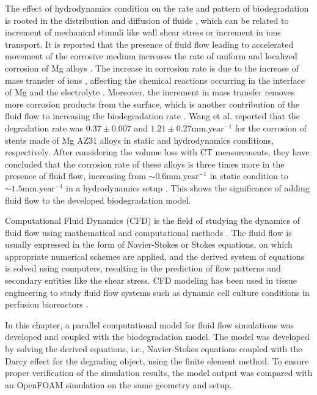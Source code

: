 
The effect of hydrodynamics condition on the rate and pattern of biodegradation is rooted in the distribution and diffusion of fluids \cite{Efird2011}, which can be related to increment of mechanical stimuli like wall shear stress or increment in ions transport. It is reported that the presence of fluid flow leading to accelerated movement of the corrosive medium increases the rate of uniform and localized corrosion of Mg alloys \cite{Wang2014}. The increase in corrosion rate is due to the increase of mass transfer of ions \cite{Efird2011}, affecting the chemical reactions occurring in the interface of Mg and the electrolyte \cite{Hiromoto2008,Xu2009}. Moreover, the increment in mass transfer removes more corrosion products from the surface, which is another contribution of the fluid flow to increasing the biodegradation rate \cite{Efird2011}. Wang et al. \cite{Wang2014} reported that the degradation rate was $0.37\pm0.007$ and $1.21\pm0.27 \text{mm.year}^{-1}$ for the corrosion of stents made of Mg AZ31 alloys in static and hydrodynamics conditions, respectively. After considering the volume loss with \gls{CT} measurements, they have concluded that the corrosion rate of these alloys is three times more in the presence of fluid flow, increasing from $\sim 0.6\text{mm.year}^{-1}$ in static condition to $\sim 1.5\text{mm.year}^{-1}$ in a hydrodynamics setup \cite{Wang2014}. This shows the significance of adding fluid flow to the developed biodegradation model.

Computational Fluid Dynamics (\gls{CFD}) is the field of studying the dynamics of fluid flow using mathematical and computational methods \cite{H.Versteeg2007,Sharma2022}. The fluid flow is usually expressed in the form of Navier-Stokes or Stokes equations, on which appropriate numerical schemes are applied, and the derived system of equations is solved using computers, resulting in the prediction of flow patterns and secondary entities like the shear stress. \gls{CFD} modeling has been used in tissue engineering to study fluid flow systems such as dynamic cell culture conditions in perfusion bioreactors \cite{Hutmacher2008, Hossain2012,Patrachari2012}.

In this chapter, a parallel computational model for fluid flow simulations was developed and coupled with the biodegradation model. The model was developed by solving the derived equations, i.e., Navier-Stokes equations coupled with the Darcy effect for the degrading object, using the finite element method. To ensure proper verification of the simulation results, the model output was compared with an OpenFOAM simulation on the same geometry and setup. 

